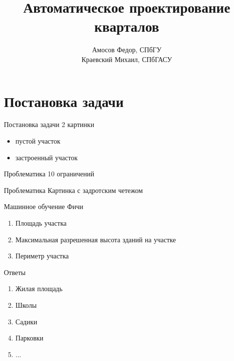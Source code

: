 \documentclass[14pt, fleqn, xcolor={dvipsnames, table}]{beamer}
\title{Автоматическое проектирование кварталов}
\author[]{
    \small{
        Амосов Федор, СПбГУ\\
        Краевский Михаил, СПбГАСУ
    }
}
\date{}
\begin{document}
    \begin{frame}
        \maketitle
        \small
    \end{frame}

    \section{Постановка задачи}  
    
        \begin{frame}{Постановка задачи}
            2 картинки
            \begin{itemize}
                \item пустой участок
                \item застроенный участок
            \end{itemize}        
        \end{frame}
        
        \begin{frame}{Проблематика}
            10 ограничений     
        \end{frame}
        
        \begin{frame}{Проблематика}
            Картинка с задротским четежом   
        \end{frame}
        
        \begin{frame}{Машинное обучение}
            Фичи
            \begin{enumerate}
               \item Площадь участка
               \item Максимальная разрешенная высота зданий на участке
               \item Периметр участка
            \end{enumerate}
            Ответы
            \begin{enumerate}
               \item Жилая площадь
               \item Школы
               \item Садики
               \item Парковки
               \item ...
            \end{enumerate}           
        \end{frame}
        
\end{document}
